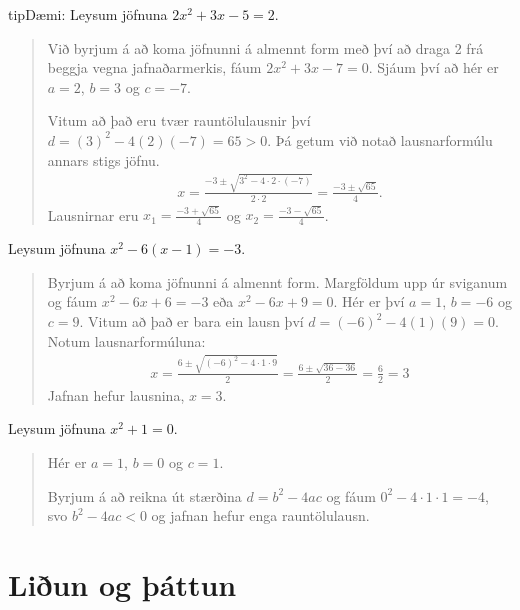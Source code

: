 \documentclass[a4paper,10pt,icelandic]{sphinxmanual}
\begin{document}
\begin{sphinxadmonition}{tip}{Dæmi:}
 Leysum jöfnuna \(2x^2 + 3x - 5 = 2\).
\begin{quote}

Við byrjum á að koma jöfnunni á almennt form með því að draga 2 frá beggja vegna jafnaðarmerkis, fáum \(2x^2 + 3x - 7=0\).
Sjáum því að hér er \(a=2\), \(b=3\) og \(c=-7\).

Vitum að það eru tvær rauntölulausnir því \(d=(3)^2-4(2)(-7)=65 > 0\). Þá getum við notað lausnarformúlu annars stigs jöfnu.
\begin{equation*}
\begin{split}x = \frac{-3 \pm \sqrt{3^2 - 4 \cdot 2 \cdot (-7)}}{2 \cdot 2}
= \frac{-3 \pm \sqrt{65}}{4}.\end{split}
\end{equation*}
Lausnirnar eru \(x_1=\frac{-3 + \sqrt{65}}{4}\) og \(x_2=\frac{-3 - \sqrt{65} }{4}\).
\end{quote}

 Leysum jöfnuna \(x^2-6(x-1)=-3\).
\begin{quote}

Byrjum á að koma jöfnunni á almennt form.
Margföldum upp úr sviganum og fáum \(x^2-6x+6=-3\) eða \(x^2-6x+9=0\).
Hér er því \(a=1\), \(b=-6\) og \(c=9\).
Vitum að það er bara ein lausn því \(d=(-6)^2-4(1)(9)=0\).
Notum lausnarformúluna:
\begin{equation*}
\begin{split}x=\frac{6 \pm \sqrt{(-6)^2-4 \cdot 1 \cdot 9}}{2}=\frac{6 \pm \sqrt{36-36}}{2}=\frac{6}{2}=3\end{split}
\end{equation*}
Jafnan hefur lausnina, \(x=3\).
\end{quote}

 Leysum jöfnuna \(x^2+1=0\).
\begin{quote}

Hér er \(a=1\), \(b=0\) og \(c=1\).

Byrjum á að reikna út stærðina \(d=b^2-4ac\) og fáum \(0^2-4 \cdot 1 \cdot 1=-4\), svo \(b^2-4ac<0\) og jafnan hefur enga rauntölulausn.
\end{quote}
\end{sphinxadmonition}


\section{Liðun og þáttun}
\label{\detokenize{Kafli02:liun-og-attun}}
\end{document}
